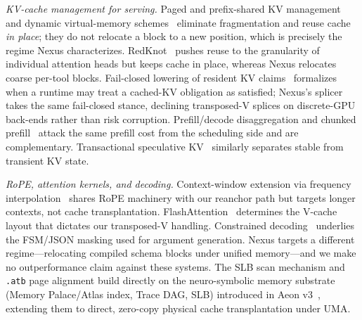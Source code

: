\documentclass[10pt,conference]{IEEEtran}
\newcommand{\code}[1]{\texttt{\small #1}}
\begin{document}
\emph{KV-cache management for serving.} Paged and prefix-shared KV
management~\cite{kwon2023vllm,zheng2024sglang} and dynamic virtual-memory
schemes~\cite{vattention2025,ellm} eliminate fragmentation and reuse cache \emph{in place}; they do
not relocate a block to a new position, which is precisely the regime Nexus characterizes.
RedKnot~\cite{redknot2026} pushes reuse to the granularity of individual attention heads but keeps
cache in place, whereas Nexus relocates coarse per-tool blocks. Fail-closed lowering of resident KV
claims~\cite{stepanek2026} formalizes when a runtime may treat a cached-KV obligation as satisfied;
Nexus's splicer takes the same fail-closed stance, declining transposed-V splices on discrete-GPU
back-ends rather than risk corruption. Prefill/decode disaggregation and chunked
prefill~\cite{agrawal2024sarathi,patel2024splitwise,zhong2024distserve} attack the same prefill cost
from the scheduling side and are complementary. Transactional speculative KV~\cite{transkvcache}
similarly separates stable from transient KV state.

\emph{RoPE, attention kernels, and decoding.} Context-window extension via frequency
interpolation~\cite{peng2023yarn} shares RoPE machinery with our reanchor path but targets longer
contexts, not cache transplantation. FlashAttention~\cite{dao2022flashattention,dao2023flashattention2}
determines the V-cache layout that dictates our transposed-V handling. Constrained
decoding~\cite{willard2023outlines,beurer2023lmql,guidance2023} underlies the FSM/JSON masking used
for argument generation. Nexus targets a different regime---relocating compiled schema blocks under
unified memory---and we make no outperformance claim against these systems. The SLB scan mechanism and \code{.atb} page alignment build directly on the neuro-symbolic memory substrate (Memory Palace/Atlas index, Trace DAG, SLB) introduced in Aeon v3~\cite{arslan2026aeon}, extending them to direct, zero-copy physical cache transplantation under UMA.
\end{document}
